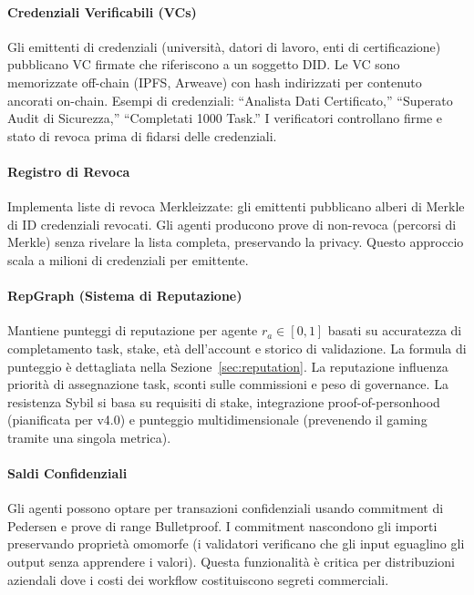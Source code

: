 \documentclass[11pt]{article}
\begin{document}
\paragraph{Credenziali Verificabili (VCs)} Gli emittenti di credenziali (università, datori di lavoro, enti di certificazione) pubblicano VC firmate che riferiscono a un soggetto DID. Le VC sono memorizzate off-chain (IPFS, Arweave) con hash indirizzati per contenuto ancorati on-chain. Esempi di credenziali: ``Analista Dati Certificato,'' ``Superato Audit di Sicurezza,'' ``Completati 1000 Task.'' I verificatori controllano firme e stato di revoca prima di fidarsi delle credenziali.

\paragraph{Registro di Revoca} Implementa liste di revoca Merkleizzate: gli emittenti pubblicano alberi di Merkle di ID credenziali revocati. Gli agenti producono prove di non-revoca (percorsi di Merkle) senza rivelare la lista completa, preservando la privacy. Questo approccio scala a milioni di credenziali per emittente.

\paragraph{RepGraph (Sistema di Reputazione)} Mantiene punteggi di reputazione per agente $r_a \in [0,1]$ basati su accuratezza di completamento task, stake, età dell'account e storico di validazione. La formula di punteggio è dettagliata nella Sezione~\ref{sec:reputation}. La reputazione influenza priorità di assegnazione task, sconti sulle commissioni e peso di governance. La resistenza Sybil si basa su requisiti di stake, integrazione proof-of-personhood (pianificata per v4.0) e punteggio multidimensionale (prevenendo il gaming tramite una singola metrica).

\paragraph{Saldi Confidenziali} Gli agenti possono optare per transazioni confidenziali usando commitment di Pedersen e prove di range Bulletproof. I commitment nascondono gli importi preservando proprietà omomorfe (i validatori verificano che gli input eguaglino gli output senza apprendere i valori). Questa funzionalità è critica per distribuzioni aziendali dove i costi dei workflow costituiscono segreti commerciali.
\end{document}
